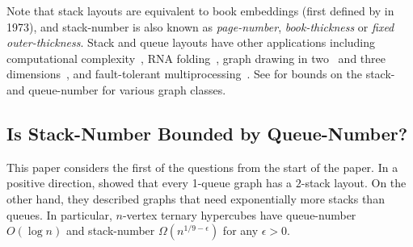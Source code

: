\documentclass[kpfonts]{patmorin}
\begin{document}
Note that stack layouts are equivalent to book embeddings (first defined by \citet{Ollmann73} in 1973), and stack-number is also known as \emph{page-number}, \emph{book-thickness} or \emph{fixed outer-thickness}. Stack and queue layouts have other applications including computational complexity~\citep{GKS89,DSW16,Bourgain09,BY13},  RNA folding~\citep{HS99}, graph drawing in two~\citep{BB04,ADFPR12,SSSV-JGT96} and three dimensions~\citep{DMW05,Wood-GD01,DMW17,DPW04},
and fault-tolerant multiprocessing~\citep{CLR87,Rosenberg83a,Rosenberg86a,Rosenberg86}.
See \citep{BK79,Blankenship-PhD03,DujWoo04,DujWoo-DCG07,DJMMUW20,DFP13,BFGMMRU19,Yannakakis89,Yann20,MBKPRU20} for bounds on the stack- and queue-number for various graph classes.

\subsection*{Is Stack-Number Bounded by Queue-Number?}

This paper considers the first of the questions from the start of the paper. In a positive direction, \citet{HLR92}  showed that every 1-queue graph has a $2$-stack layout. On the other hand, they described graphs that need exponentially more stacks than queues. In particular, $n$-vertex ternary hypercubes have queue-number $O(\log n)$ and stack-number $\Omega(n^{1/9-\epsilon})$ for any $\epsilon>0$.


\end{document}
